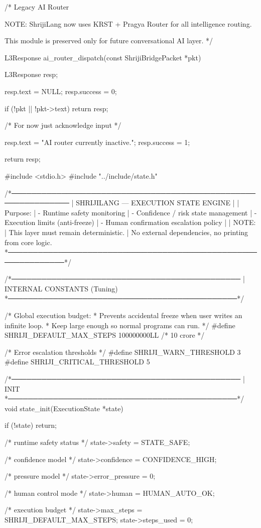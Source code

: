 \documentclass{article}
\begin{document}
/*
   Legacy AI Router

   NOTE:
   ShrijiLang now uses KRST + Pragya Router
   for all intelligence routing.

   This module is preserved only for
   future conversational AI layer.
*/

L3Response ai_router_dispatch(const ShrijiBridgePacket *pkt)
{
    L3Response resp;

    resp.text = NULL;
    resp.success = 0;

    if (!pkt || !pkt->text)
        return resp;

    /* For now just acknowledge input */

    resp.text = "AI router currently inactive.";
    resp.success = 1;

    return resp;
}
#include <stdio.h>
#include "../include/state.h"

/*──────────────────────────────────────────────────────────────
 | SHRIJILANG — EXECUTION STATE ENGINE
 |
 | Purpose:
 |   - Runtime safety monitoring
 |   - Confidence / risk state management
 |   - Execution limits (anti-freeze)
 |   - Human confirmation escalation policy
 |
 | NOTE:
 |   This layer must remain deterministic.
 |   No external dependencies, no printing from core logic.
 *──────────────────────────────────────────────────────────────*/

/*──────────────────────────────────────────────
 | INTERNAL CONSTANTS (Tuning)
 *──────────────────────────────────────────────*/

/* Global execution budget:
 * Prevents accidental freeze when user writes an infinite loop.
 * Keep large enough so normal programs can run.
 */
#define SHRIJI_DEFAULT_MAX_STEPS   100000000LL  /* 10 crore */

/* Error escalation thresholds */
#define SHRIJI_WARN_THRESHOLD      3
#define SHRIJI_CRITICAL_THRESHOLD  5

/*──────────────────────────────────────────────
 | INIT
 *──────────────────────────────────────────────*/
void state_init(ExecutionState *state)
{
    if (!state) return;

    /* runtime safety status */
    state->safety = STATE_SAFE;

    /* confidence model */
    state->confidence = CONFIDENCE_HIGH;

    /* pressure model */
    state->error_pressure = 0;

    /* human control mode */
    state->human = HUMAN_AUTO_OK;

    /* execution budget */
    state->max_steps  = SHRIJI_DEFAULT_MAX_STEPS;
    state->steps_used = 0;
}
\end{document}
